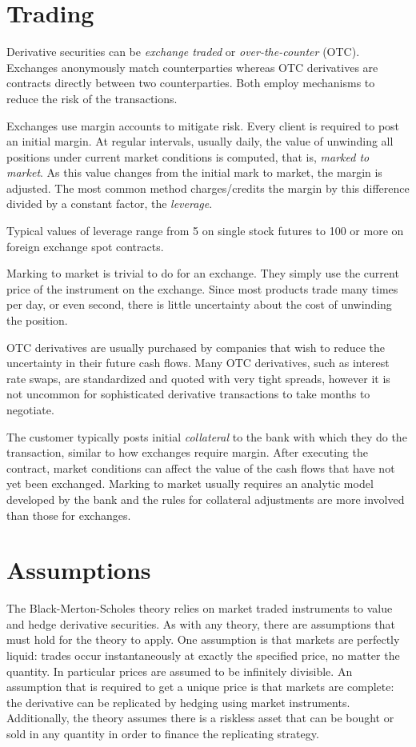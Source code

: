 \section{Trading}
Derivative securities can be {\em exchange traded} or {\em
over-the-counter} (OTC). Exchanges anonymously match counterparties
whereas OTC derivatives are contracts directly between two
counterparties. Both employ mechanisms to reduce the risk of the
transactions.

Exchanges use margin accounts to mitigate risk. Every client is required
to post an initial margin. At regular intervals, usually daily, the
value of unwinding all positions under current market conditions is
computed, that is, {\em marked to market}.  As this value changes from the
initial mark to market, the margin is adjusted. The most common method
charges/credits the margin by this difference divided by a constant
factor, the {\em leverage}.

Typical values of leverage range from 5 on single stock futures
to 100 or more on foreign exchange spot contracts.

Marking to market is trivial to do for an exchange. They simply
use the current price of the instrument on the exchange. Since
most products trade many times per day, or even second, there
is little uncertainty about the cost of unwinding the position.

OTC derivatives are usually purchased by companies that wish to reduce
the uncertainty in their future cash flows.  Many OTC derivatives, such as
interest rate swaps, are standardized and quoted with very tight spreads,
however it is not uncommon for sophisticated derivative transactions to
take months to negotiate.

The customer typically posts initial {\em collateral} to the bank
with which they do the transaction, similar to how exchanges require
margin. After executing the contract, market conditions can affect the
value of the cash flows that have not yet been exchanged. Marking to
market usually requires an analytic model developed by the bank and
the rules for collateral adjustments are more involved than those for
exchanges.

\section{Assumptions}
The Black-Merton-Scholes theory relies on market traded instruments to
value and hedge derivative securities.  As with any theory, there are
assumptions that must hold for the theory to apply.  One assumption
is that markets are perfectly liquid: trades occur instantaneously at
exactly the specified price, no matter the quantity. In particular prices
are assumed to be infinitely divisible.  An assumption that is required
to get a unique price is that markets are complete: the derivative can
be replicated by hedging using market instruments. Additionally, the
theory assumes there is a riskless asset that can be bought or sold in
any quantity in order to finance the replicating strategy.

